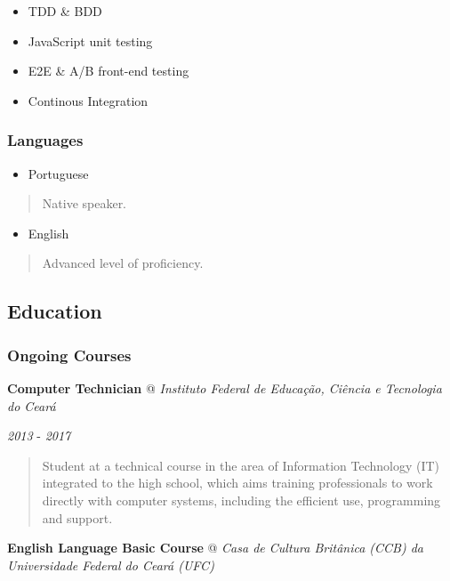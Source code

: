 \documentclass[]{article}
\providecommand{\tightlist}{%
  \setlength{\itemsep}{0pt}\setlength{\parskip}{0pt}}
\begin{document}
\begin{itemize}
\item
  TDD \& BDD
\item
  JavaScript unit testing
\item
  E2E \& A/B front-end testing
\item
  Continous Integration
\end{itemize}

\subsubsection{Languages}\label{languages}

\begin{itemize}
\tightlist
\item
  Portuguese
\end{itemize}

\begin{quote}
Native speaker.
\end{quote}

\begin{itemize}
\tightlist
\item
  English
\end{itemize}

\begin{quote}
Advanced level of proficiency.
\end{quote}

\subsection{Education}\label{education}

\subsubsection{Ongoing Courses}\label{ongoing-courses}

\textbf{Computer Technician} @ \emph{Instituto Federal de Educação,
Ciência e Tecnologia do Ceará}

\emph{2013} - \emph{2017}

\begin{quote}
Student at a technical course in the area of Information Technology (IT)
integrated to the high school, which aims training professionals to work
directly with computer systems, including the efficient use, programming
and support.
\end{quote}

\textbf{English Language Basic Course} @ \emph{Casa de Cultura Britânica
(CCB) da Universidade Federal do Ceará (UFC)}
\end{document}
